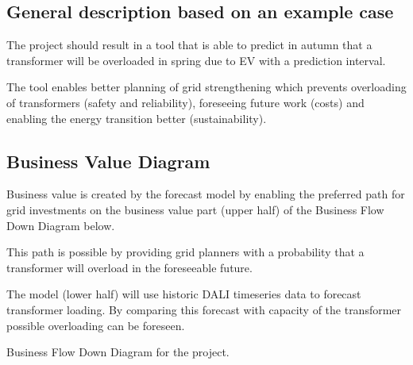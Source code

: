 \documentclass[letterpaper,10pt,english]{sphinxmanual}
\let\sphinxpxdimen\pdfpxdimen\else\newdimen\sphinxpxdimen
\begin{document}
\subsection{General description based on an example case}
\label{\detokenize{business_understanding:general-description-based-on-an-example-case}}
\begin{DUlineblock}{0em}
\item[] The project should result in a tool that is able to predict in autumn that a transformer will be overloaded in spring due to EV with a prediction interval.
\item[] The tool enables better planning of grid strengthening which prevents overloading of transformers (safety and reliability), foreseeing future work (costs) and enabling the energy transition better (sustainability).
\end{DUlineblock}


\subsection{Business Value Diagram}
\label{\detokenize{business_understanding:business-value-diagram}}
\begin{DUlineblock}{0em}
\item[] Business value is created by the forecast model by enabling the preferred path for grid investments on the business value part (upper half) of the Business Flow Down Diagram below.
\item[] This path is possible by providing grid planners with a probability that a transformer will overload in the foreseeable future.
\item[] The model (lower half) will use historic DALI timeseries data to forecast transformer loading. By comparing this forecast with capacity of the transformer possible overloading can be foreseen.
\end{DUlineblock}

\noindent{\hspace*{\fill}\sphinxincludegraphics[width=800\sphinxpxdimen]{{value_flow_down}.png}\hspace*{\fill}}

Business Flow Down Diagram for the project.
\end{document}
